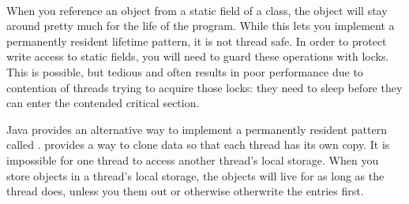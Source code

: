 \paragraph{\TLS}
\tlsindex %
\label{sec:thread-local-storage}
When you reference an object from a static field of a class, the object will
stay around pretty much for the life of the program. While this lets you
implement a permanently resident lifetime pattern, it is not thread safe. In
order to protect write access to static fields, you will need to guard these
operations with locks. This is possible, but tedious and often results in poor
performance due to contention of threads trying to acquire those locks: they
need to sleep before they can enter the contended critical section.

Java provides an alternative way to implement a permanently resident pattern
called \emph{\tls\/}. \tls provides a way to clone data so that each thread has
its own copy. It is impossible for one thread to access another thread's local
storage. When you store objects in a thread's local storage, the objects will
live for as long as the thread does, unless you  them out or
otherwise otherwrite the entries first.

